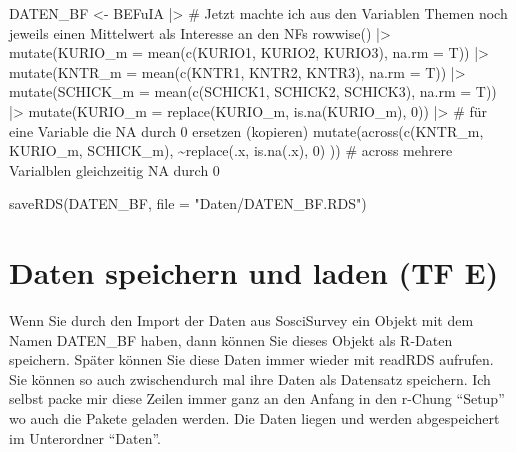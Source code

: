 \documentclass[twoside, pagesize, fontsize=11pt, dvipsnames]{scrreport}
\newenvironment{Shaded}{\begin{snugshade}}{\end{snugshade}}
\newcommand{\AttributeTok}[1]{\textcolor[rgb]{0.40,0.45,0.13}{#1}}
\newcommand{\CommentTok}[1]{\textcolor[rgb]{0.37,0.37,0.37}{#1}}
\newcommand{\DecValTok}[1]{\textcolor[rgb]{0.68,0.00,0.00}{#1}}
\newcommand{\FunctionTok}[1]{\textcolor[rgb]{0.28,0.35,0.67}{#1}}
\newcommand{\NormalTok}[1]{\textcolor[rgb]{0.00,0.23,0.31}{#1}}
\newcommand{\OtherTok}[1]{\textcolor[rgb]{0.00,0.23,0.31}{#1}}
\newcommand{\SpecialCharTok}[1]{\textcolor[rgb]{0.37,0.37,0.37}{#1}}
\newcommand{\StringTok}[1]{\textcolor[rgb]{0.13,0.47,0.30}{#1}}
\begin{document}
\begin{Shaded}
\begin{Highlighting}[]
\NormalTok{DATEN\_BF }\OtherTok{\textless{}{-}}\NormalTok{ BEFuIA }\SpecialCharTok{|\textgreater{}} \CommentTok{\# Jetzt machte ich aus den Variablen Themen noch jeweils einen Mittelwert als Interesse an den NFs}
  \FunctionTok{rowwise}\NormalTok{() }\SpecialCharTok{|\textgreater{}} 
  \FunctionTok{mutate}\NormalTok{(}\AttributeTok{KURIO\_m =} \FunctionTok{mean}\NormalTok{(}\FunctionTok{c}\NormalTok{(KURIO1, KURIO2, KURIO3), }\AttributeTok{na.rm =}\NormalTok{ T)) }\SpecialCharTok{|\textgreater{}} 
  \FunctionTok{mutate}\NormalTok{(}\AttributeTok{KNTR\_m =} \FunctionTok{mean}\NormalTok{(}\FunctionTok{c}\NormalTok{(KNTR1, KNTR2, KNTR3), }\AttributeTok{na.rm =}\NormalTok{ T)) }\SpecialCharTok{|\textgreater{}} 
  \FunctionTok{mutate}\NormalTok{(}\AttributeTok{SCHICK\_m =} \FunctionTok{mean}\NormalTok{(}\FunctionTok{c}\NormalTok{(SCHICK1, SCHICK2, SCHICK3), }\AttributeTok{na.rm =}\NormalTok{ T)) }\SpecialCharTok{|\textgreater{}} 
  \FunctionTok{mutate}\NormalTok{(}\AttributeTok{KURIO\_m =} \FunctionTok{replace}\NormalTok{(KURIO\_m, }\FunctionTok{is.na}\NormalTok{(KURIO\_m), }\DecValTok{0}\NormalTok{)) }\SpecialCharTok{|\textgreater{}} \CommentTok{\# für eine Variable die NA durch 0 ersetzen (kopieren)}
  \FunctionTok{mutate}\NormalTok{(}\FunctionTok{across}\NormalTok{(}\FunctionTok{c}\NormalTok{(KNTR\_m, KURIO\_m, SCHICK\_m), }\SpecialCharTok{\textasciitilde{}}\FunctionTok{replace}\NormalTok{(.x, }\FunctionTok{is.na}\NormalTok{(.x), }\DecValTok{0}\NormalTok{) )) }\CommentTok{\# across mehrere Varialblen gleichzeitig NA durch 0}

\FunctionTok{saveRDS}\NormalTok{(DATEN\_BF, }\AttributeTok{file =} \StringTok{"Daten/DATEN\_BF.RDS"}\NormalTok{)}
\end{Highlighting}
\end{Shaded}

\hypertarget{daten-speichern-und-laden-tf-e}{%
\section{Daten speichern und laden (TF
E)}\label{daten-speichern-und-laden-tf-e}}

Wenn Sie durch den Import der Daten aus SosciSurvey ein Objekt mit dem
Namen DATEN\_BF haben, dann können Sie dieses Objekt als R-Daten
speichern. Später können Sie diese Daten immer wieder mit readRDS
aufrufen. Sie können so auch zwischendurch mal ihre Daten als Datensatz
speichern. Ich selbst packe mir diese Zeilen immer ganz an den Anfang in
den r-Chung \enquote{Setup} wo auch die Pakete geladen werden. Die Daten
liegen und werden abgespeichert im Unterordner \enquote{Daten}.
\end{document}

